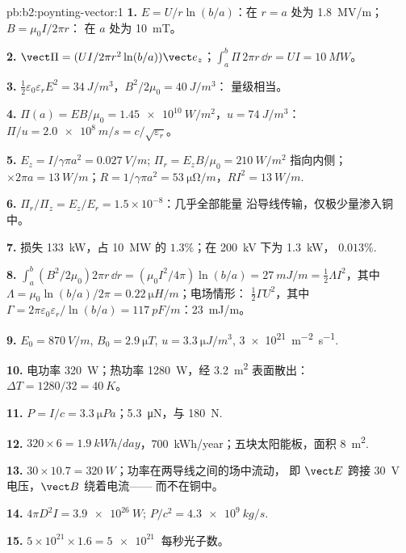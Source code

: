 \begin{solution}{pb:b2:poynting-vector:1}
\textbf{1.} $E = U/r\ln(b/a)$：在 $r = a$ 处为 \qty{1.8}{MV/m}；$B = \mu_0I/2\pi r$：
在 $a$ 处为 \qty{10}{mT}。

\textbf{2.} $\vect\Pi = (UI/2\pi r^2\ln(b/a))\vect e_z$；$\int_a^b\Pi\,2\pi r\,\dd r = UI =
\qty{10}{MW}$。

\textbf{3.} $\tfrac12\varepsilon_0\varepsilon_rE^2 = \qty{34}{J/m^3}$，$B^2/2\mu_0 = \qty{40}{J/m^3}$：
量级相当。

\textbf{4.} $\Pi(a) = EB/\mu_0 = \qty{1.45e10}{W/m^2}$，$u = \qty{74}{J/m^3}$：$\Pi/u =
\qty{2.0e8}{m/s} = c/\sqrt{\varepsilon_r}$。

\textbf{5.} $E_z = I/\gamma\pi a^2 = \qty{0.027}{V/m}$; $\Pi_r = E_zB/\mu_0 = \qty{210}{W/m^2}$
指向内侧；$\times2\pi a = \qty{13}{W/m}$；$R = 1/\gamma\pi a^2 = \qty{53}{\micro\ohm/m}$，$RI^2 =
\qty{13}{W/m}$.

\textbf{6.} $\Pi_r/\Pi_z = E_z/E_r = 1.5 \times 10^{-8}$：几乎全部能量
沿导线传输，仅极少量渗入铜中。

\textbf{7.} 损失 \qty{133}{kW}，占 \qty{10}{MW} 的 $1.3\%$；在 \qty{200}{kV} 下为 \qty{1.3}{kW}，
$0.013\%$.

\textbf{8.} $\int_a^b(B^2/2\mu_0)2\pi r\,\dd r = (\mu_0I^2/4\pi)\ln(b/a) = \qty{27}{mJ/m} =
\tfrac12\Lambda I^2$，其中 $\Lambda = \mu_0\ln(b/a)/2\pi = \qty{0.22}{\micro H/m}$；电场情形：
$\tfrac12\Gamma U^2$，其中 $\Gamma = 2\pi\varepsilon_0\varepsilon_r/\ln(b/a) = \qty{117}{pF/m}$：\qty{23}{mJ/m}。

\textbf{9.} $E_0 = \qty{870}{V/m}$, $B_0 = \qty{2.9}{\micro T}$, $u = \qty{3.3}{\micro J/m^3}$,
\qty{3e21}{m^{-2}.s^{-1}}.

\textbf{10.} 电功率 \qty{320}{W}；热功率 \qty{1280}{W}，经 \qty{3.2}{m^2}
表面散出：$\Delta T = 1280/32 = \qty{40}{K}$。

\textbf{11.} $P = I/c = \qty{3.3}{\micro Pa}$；\qty{5.3}{\micro N}，与
\qty{180}{N}.

\textbf{12.} $320 \times 6 = \qty{1.9}{kWh/day}$，\qty{700}{kWh/year}；五块太阳能板，面积
\qty{8}{m^2}.

\textbf{13.} $30 \times 10.7 = \qty{320}{W}$；功率在两导线之间的场中流动，
即 $\vect E$ 跨接 \qty{30}{V} 电压，$\vect B$ 绕着电流——
而不在铜中。

\textbf{14.} $4\pi D^2I = \qty{3.9e26}{W}$; $P/c^2 = \qty{4.3e9}{kg/s}$.

\textbf{15.} $5 \times 10^{21} \times 1.6 = \qty{5e21}{}$ 每秒光子数。


\end{solution}
